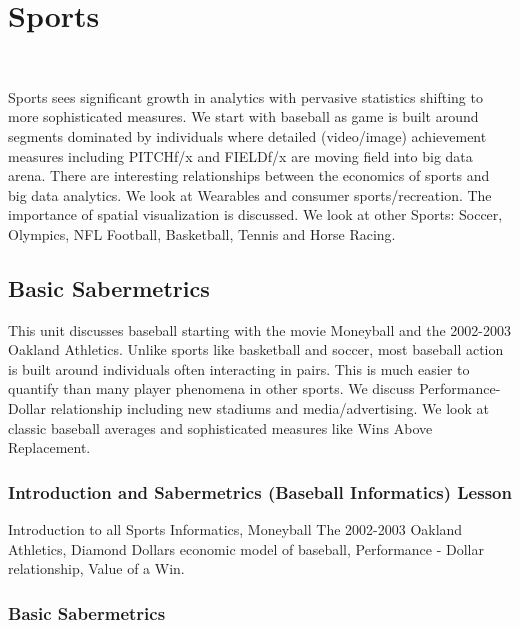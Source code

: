 
\chapter{Sports}
\label{c:sports}

\FILENAME\

Sports sees significant growth in analytics with pervasive statistics
shifting to more sophisticated measures. We start with baseball as game
is built around segments dominated by individuals where detailed
(video/image) achievement measures including PITCHf/x and FIELDf/x are
moving field into big data arena. There are interesting relationships
between the economics of sports and big data analytics. We look at
Wearables and consumer sports/recreation. The importance of spatial
visualization is discussed. We look at other Sports: Soccer, Olympics,
NFL Football, Basketball, Tennis and Horse Racing.

\section{Basic Sabermetrics}

This unit discusses baseball starting with the movie Moneyball and the
2002-2003 Oakland Athletics. Unlike sports like basketball and soccer,
most baseball action is built around individuals often interacting in
pairs. This is much easier to quantify than many player phenomena in
other sports. We discuss Performance-Dollar relationship including new
stadiums and media/advertising. We look at classic baseball averages and
sophisticated measures like Wins Above Replacement.




\subsection{Introduction and Sabermetrics (Baseball Informatics)
  Lesson}

Introduction to all Sports Informatics, Moneyball The 2002-2003 Oakland
Athletics, Diamond Dollars economic model of baseball, Performance -
Dollar relationship, Value of a Win.




\subsection{Basic Sabermetrics}\label{basic-sabermetrics}

